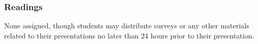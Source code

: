 \documentclass[11pt,a4paper]{article}
\begin{document}
\subsubsection*{Readings}
None assigned, though students may distribute surveys or any other materials related to their presentations no later than 24 hours prior to their presentation.




\end{document}
